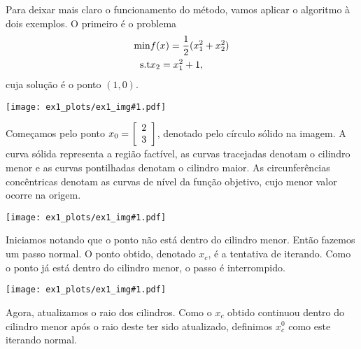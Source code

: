 Para deixar mais claro o funcionamento do método, vamos aplicar o algoritmo à
dois exemplos. O primeiro é o problema
\begin{eqnarray}
  \min & f(x) = \frac{1}{2}(x_1^2 + x_2^2) \nonumber \\
  \mbox{s.t} & x_2 = x_1^2 + 1, \nonumber
\end{eqnarray}
cuja solução é o ponto $(1,0)$.

\newcommand{\addexum}[1]{
  \texttt{[image: ex1\_plots/ex1\_img\#1.pdf]}
}

\begin{center}
  \addexum{1}
\end{center}

\begin{center}
  \begin{minipage}{0.9\textwidth}
  Começamos pelo ponto $x_0 = \left[\begin{array}{c}2 \\ 3\end{array}\right]$, denotado pelo círculo sólido na imagem.
  A curva sólida representa a região factível, as curvas tracejadas 
  denotam o cilindro menor e as curvas pontilhadas denotam o cilindro
  maior. As circunferências concêntricas denotam as curvas de nível da função objetivo, cujo
  menor valor ocorre na origem.
\end{minipage}
\end{center}

\begin{center}
  \addexum{2}
\end{center}

\begin{center}
  \begin{minipage}{0.9\textwidth}
  Iniciamos notando que o ponto não está dentro do cilindro menor. Então
  fazemos um passo normal. O ponto obtido, denotado $x_c$, é a tentativa de
  iterando. Como o ponto já está dentro do cilindro
  menor, o passo é interrompido.
\end{minipage}
\end{center}

\begin{center}
  \addexum{3}
\end{center}

\begin{center}
  \begin{minipage}{0.9\textwidth}
  Agora, atualizamos o raio dos cilindros. Como o $x_c$ obtido continuou
  dentro do cilindro menor após o raio deste ter sido atualizado, definimos
  $x_c^0$ como este iterando normal.
\end{minipage}
\end{center}

